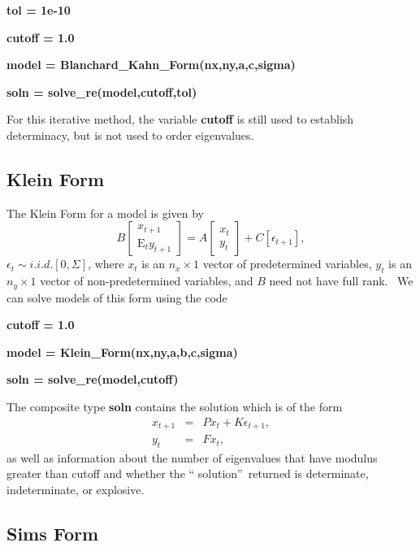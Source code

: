 \documentclass[thmsa,notitlepage,11pt]{article}
\begin{document}
\bigskip

\textbf{tol = 1e-10}

\textbf{cutoff = 1.0}

\textbf{model = Blanchard\_Kahn\_Form(nx,ny,a,c,sigma)}

\textbf{soln = solve\_re(model,cutoff,tol)}

\bigskip

For this iterative method, the variable \textbf{cutoff} is still used to
establish determinacy, but is not used to order eigenvalues.

\subsection{Klein Form}

The Klein Form for a model is given by%
\[
B\left[ 
\begin{array}{c}
x_{t+1} \\ 
\text{E}_{t}y_{t+1}%
\end{array}%
\right] =A\left[ 
\begin{array}{c}
x_{t} \\ 
y_{t}%
\end{array}%
\right] +C\left[ \epsilon _{t+1}\right] , 
\]%
$\epsilon _{t}\sim i.i.d.[0,\Sigma ]$, where $x_{t}$ is an $n_{x}\times 1$
vector of predetermined variables, $y_{t}$ is an $n_{y}\times 1$ vector of
non-predetermined variables, and $B$ need not have full rank. \ We can solve
models of this form using the code

\bigskip

\textbf{cutoff = 1.0}

\textbf{model = Klein\_Form(nx,ny,a,b,c,sigma)}

\textbf{soln = solve\_re(model,cutoff) }

\bigskip

The composite type \textbf{soln} contains the solution which is of the form%
\begin{eqnarray*}
x_{t+1} &=&Px_{t}+K\epsilon _{t+1}, \\
y_{t} &=&Fx_{t},
\end{eqnarray*}%
as well as information about the number of eigenvalues that have modulus
greater than cutoff and whether the \textquotedblleft
solution\textquotedblright\ returned is determinate, indeterminate, or
explosive.

\subsection{Sims Form}
\end{document}
